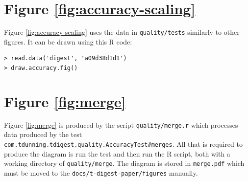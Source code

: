 \documentclass[]{statsoc}
\begin{document}
\section{Figure \ref{fig:accuracy-scaling}}
Figure \ref{fig:accuracy-scaling} uses the data in {\tt quality/tests} similarly to other figures. It can be drawn using this R code:
\begin{verbatim}
> read.data('digest', 'a09d38d1d1')
> draw.accuracy.fig()
\end{verbatim}
\section{Figure \ref{fig:merge}}
Figure \ref{fig:merge} is produced by the script {\tt quality/merge.r} which processes data produced by the test {\tt com.tdunning.tdigest.quality.AccuracyTest\#merges}. All that is required to produce the diagram is run the test and then run the R script, both with a working directory of {\tt quality/merge}. The diagram is stored in {\tt merge.pdf} which must be moved to the {\tt docs/t-digest-paper/figures} manually.
\end{document}
